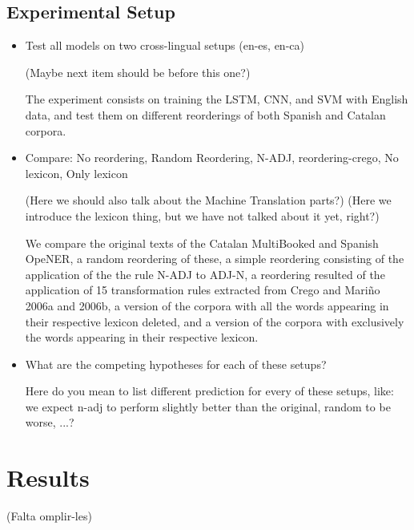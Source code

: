 \documentclass[11pt,a4paper]{article}
\begin{document}
\subsection{Experimental Setup}

\begin{itemize}
\item Test all models on two cross-lingual setups (en-es, en-ca)

(Maybe next item should be before this one?)

The experiment consists on training the LSTM, CNN, and SVM with English data, and test them on different reorderings of both Spanish and Catalan corpora.

\item Compare: No reordering, Random Reordering, N-ADJ, reordering-crego, No lexicon, Only lexicon

(Here we should also talk about the Machine Translation parts?)
(Here we introduce the lexicon thing, but we have not talked about it yet, right?)

We compare the original texts of the Catalan MultiBooked and Spanish OpeNER, a random reordering of these, a simple reordering consisting of the application of the the rule N-ADJ to ADJ-N, a reordering resulted of the application of 15 transformation rules extracted from Crego and Mariño 2006a and 2006b, a version of the corpora with all the words appearing in their respective lexicon deleted, and a version of the corpora with exclusively the words appearing in their respective lexicon.

\item What are the competing hypotheses for each of these setups?

Here do you mean to list different prediction for every of these setups, like: we expect n-adj to perform slightly better than the original, random to be worse, ...?

\end{itemize}

\section{Results}

(Falta omplir-les)
\end{document}
